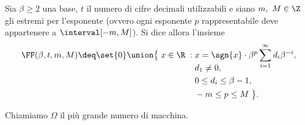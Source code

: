 \begin{definition}
    Sia $\beta \geq 2$ una base, $t$ il numero di cifre decimali utilizzabili e siano $m,\ M \in \Z$ gli estremi per l'esponente (ovvero ogni esponente $p$ rappresentabile deve appartenere a $\interval[{-m, M}]$). Si dice allora  l'insieme\[
        \FF(\beta, t, m, M) \deq \set{0} \union 
        \begin{aligned}[t]
            \big\{\; x \in \R \;:\; &x = \sgn{x}\cdot\beta^p\sum_{i=1}^\infty d_i\beta^{-i},\\[-1em]
            &d_1 \neq 0,\\
            &0 \leq d_i \leq \beta-1,\\ 
            &-m \leq p \leq M \;\big\}.
        \end{aligned}
    \] 
\end{definition}

Chiamiamo $\Omega$ il più grande numero di macchina. 